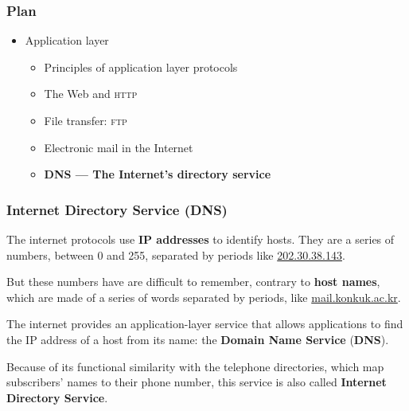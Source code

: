 
%
\begin{frame}
\frametitle{Plan}

\begin{itemize}

  \item Application layer

  \begin{itemize}

    \item Principles of application layer protocols

    \item The Web and \textsc{http}

    \item File transfer: \textsc{ftp}

    \item Electronic mail in the Internet

    \item \textbf{DNS --- The Internet's directory service}

  \end{itemize}

\end{itemize}

\end{frame}

%
\begin{frame}
\frametitle{Internet Directory Service (DNS)}

The internet protocols use \textbf{IP addresses} to identify
hosts. They are a series of numbers, between 0 and 255, separated by
periods like \url{202.30.38.143}.

But these numbers have are difficult to remember, contrary to
\textbf{host names}, which are made of a series of words separated by
periods, like \url{mail.konkuk.ac.kr}.

The internet provides an application-layer service that allows
applications to find the IP address of a host from its name: the
\textbf{Domain Name Service} (\textbf{DNS}).

Because of its functional similarity with the telephone directories,
which map subscri\-bers' names to their phone number, this service is
also called \textbf{Internet Directory Service}.

\end{frame}

